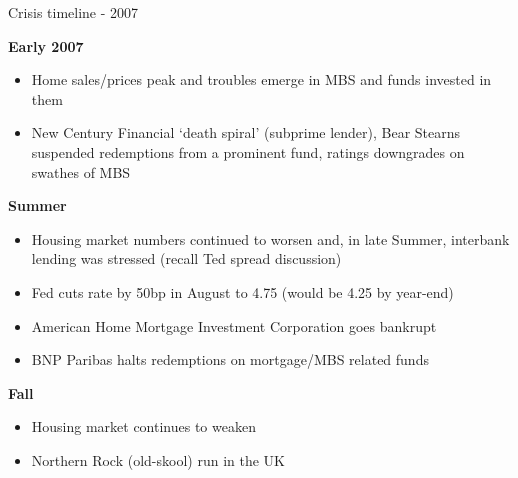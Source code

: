 

\begin{frame}{Crisis timeline - 2007}

\textbf{Early 2007}
	\begin{itemize}
	\item	Home sales/prices peak and troubles emerge in MBS and funds invested in them
	\item	New Century Financial `death spiral' (subprime lender), Bear Stearns suspended redemptions from a prominent fund, ratings downgrades on swathes of MBS
	\end{itemize}
\vspace{2mm}
\textbf{Summer}
	\begin{itemize}
	\item	Housing market numbers continued to worsen and, in late Summer, interbank lending was stressed (recall Ted spread discussion)
	\item	Fed cuts rate by 50bp in August to 4.75 (would be 4.25 by year-end)
	\item	American Home Mortgage Investment Corporation goes bankrupt
	\item	BNP Paribas halts redemptions on mortgage/MBS related funds
	\end{itemize}
\vspace{2mm}	
\textbf{Fall}
	\begin{itemize}
	\item	Housing market continues to weaken
	\item	Northern Rock (old-skool) run in the UK
	\end{itemize}

\end{frame}



